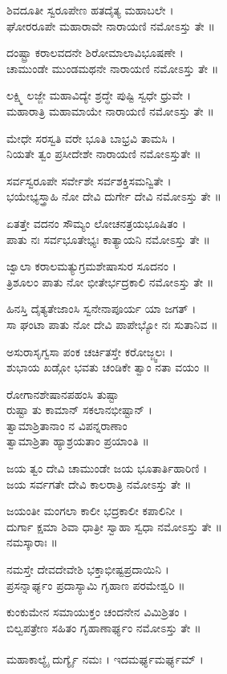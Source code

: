 ಶಿವದೂತೀ ಸ್ವರೂಪೇಣ ಹತದೈತ್ಯ ಮಹಾಬಲೇ ।\\
ಘೋರರೂಪೇ ಮಹಾರಾವೇ ನಾರಾಯಣಿ ನಮೋಽಸ್ತು ತೇ ॥

ದಂಷ್ಟ್ರಾ ಕರಾಲವದನೇ ಶಿರೋಮಾಲಾವಿಭೂಷಣೇ ।\\
ಚಾಮುಂಡೇ ಮುಂಡಮಥನೇ ನಾರಾಯಣಿ ನಮೋಽಸ್ತು ತೇ ॥

ಲಕ್ಷ್ಮಿ ಲಜ್ಜೇ ಮಹಾವಿದ್ಯೇ ಶ್ರದ್ಧೇ ಪುಷ್ಟಿ ಸ್ವಧೇ ಧ್ರುವೇ ।\\
ಮಹಾರಾತ್ರಿ ಮಹಾಮಾಯೇ ನಾರಾಯಣಿ ನಮೋಽಸ್ತು ತೇ ॥

ಮೇಧೇ ಸರಸ್ವತಿ ವರೇ ಭೂತಿ ಬಾಭ್ರವಿ ತಾಮಸಿ ।\\
ನಿಯತೇ ತ್ವಂ ಪ್ರಸೀದೇಶೇ ನಾರಾಯಣಿ ನಮೋಽಸ್ತುತೇ ॥

ಸರ್ವಸ್ವರೂಪೇ ಸರ್ವೇಶೇ ಸರ್ವಶಕ್ತಿಸಮನ್ವಿತೇ ।\\
ಭಯೇಭ್ಯಸ್ತ್ರಾಹಿ ನೋ ದೇವಿ ದುರ್ಗೇ ದೇವಿ ನಮೋಽಸ್ತು ತೇ ॥

ಏತತ್ತೇ ವದನಂ ಸೌಮ್ಯಂ ಲೋಚನತ್ರಯಭೂಷಿತಂ ।\\
ಪಾತು ನಃ ಸರ್ವಭೂತೇಭ್ಯಃ ಕಾತ್ಯಾಯನಿ ನಮೋಽಸ್ತು ತೇ ॥

ಜ್ವಾಲಾ ಕರಾಲಮತ್ಯುಗ್ರಮಶೇಷಾಸುರ ಸೂದನಂ ।\\
ತ್ರಿಶೂಲಂ ಪಾತು ನೋ ಭೀತೇರ್ಭದ್ರಕಾಲಿ ನಮೋಽಸ್ತು ತೇ ॥

ಹಿನಸ್ತಿ ದೈತ್ಯತೇಜಾಂಸಿ ಸ್ವನೇನಾಪೂರ್ಯ ಯಾ ಜಗತ್ ।\\
ಸಾ ಘಂಟಾ ಪಾತು ನೋ ದೇವಿ ಪಾಪೇಭ್ಯೋ ನಃ ಸುತಾನಿವ ॥

ಅಸುರಾಸೃಗ್ವಸಾ ಪಂಕ ಚರ್ಚಿತಸ್ತೇ ಕರೋಜ್ಜ್ವಲಃ ।\\
ಶುಭಾಯ ಖಡ್ಗೋ ಭವತು ಚಂಡಿಕೇ ತ್ವಾಂ ನತಾ ವಯಂ ॥

ರೋಗಾನಶೇಷಾನಪಹಂಸಿ ತುಷ್ಟಾ\\
        ರುಷ್ಟಾ ತು ಕಾಮಾನ್ ಸಕಲಾನಭೀಷ್ಟಾನ್ ।\\
ತ್ವಾಮಾಶ್ರಿತಾನಾಂ ನ ವಿಪನ್ನರಾಣಾಂ\\
        ತ್ವಾಮಾಶ್ರಿತಾ ಹ್ಯಾಶ್ರಯತಾಂ ಪ್ರಯಾಂತಿ ॥

ಜಯ ತ್ವಂ ದೇವಿ ಚಾಮುಂಡೇ ಜಯ ಭೂತಾರ್ತಿಹಾರಿಣಿ ।\\
ಜಯ ಸರ್ವಗತೇ ದೇವಿ ಕಾಲರಾತ್ರಿ ನಮೋಽಸ್ತು ತೇ ॥

ಜಯಂತೀ ಮಂಗಲಾ ಕಾಲೀ ಭದ್ರಕಾಲೀ ಕಪಾಲಿನೀ ।\\
ದುರ್ಗಾ ಕ್ಷಮಾ ಶಿವಾ ಧಾತ್ರೀ ಸ್ವಾಹಾ ಸ್ವಧಾ ನಮೋಽಸ್ತು ತೇ ॥\\
ನಮಸ್ಕಾರಾಃ ॥

ನಮಸ್ತೇ ದೇವದೇವೇಶಿ ಭಕ್ತಾಭೀಷ್ಟಪ್ರದಾಯಿನಿ ।\\
ಪ್ರಸನ್ನಾರ್ಘ್ಯಂ ಪ್ರದಾಸ್ಯಾಮಿ ಗೃಹಾಣ ಪರಮೇಶ್ವರಿ ॥

ಕುಂಕುಮೇನ ಸಮಾಯುಕ್ತಂ ಚಂದನೇನ ವಿಮಿಶ್ರಿತಂ ।\\
ಬಿಲ್ವಪತ್ರೇಣ ಸಹಿತಂ ಗೃಹಾಣಾರ್ಘ್ಯಂ ನಮೋಽಸ್ತು ತೇ ॥\\
\\
ಮಹಾಕಾಲ್ಯೈ ದುರ್ಗ್ಯೈ ನಮಃ । ಇದಮರ್ಘ್ಯಮರ್ಘ್ಯಮ್ ।

